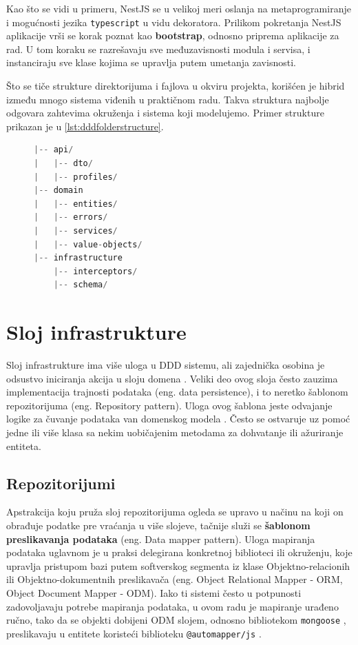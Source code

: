 \documentclass[12pt,oneside]{memoir}
\begin{document}
Kao što se vidi u primeru, NestJS se u velikoj meri oslanja na metaprogramiranje i mogućnosti jezika \verb|typescript| u vidu dekoratora. Prilikom pokretanja NestJS aplikacije vrši se korak poznat kao \textbf{bootstrap}, odnosno priprema aplikacije za rad. U tom koraku se razrešavaju sve međuzavisnosti modula i servisa, i instanciraju sve klase kojima se upravlja putem umetanja zavisnosti.

Što se tiče strukture direktorijuma i fajlova u okviru projekta, korišćen je hibrid između mnogo sistema viđenih u praktičnom radu. Takva struktura najbolje odgovara zahtevima okruženja i sistema koji modelujemo. Primer strukture prikazan je u \ref{lst:dddfolderstructure}.

\begin{figure}[h]
\begin{lstlisting}[language=JavaScript, style=ES6, caption={fajl tickets.module.ts},label={lst:dddfolderstructure}]
|-- api/
|   |-- dto/
|   |-- profiles/
|-- domain
|   |-- entities/
|   |-- errors/
|   |-- services/
|   |-- value-objects/
|-- infrastructure
    |-- interceptors/
    |-- schema/
\end{lstlisting}
\end{figure}

\section{Sloj infrastrukture}

Sloj infrastrukture ima više uloga u DDD sistemu, ali zajednička osobina je odsustvo iniciranja akcija u sloju domena \cite{dddfull}. Veliki deo ovog sloja često zauzima implementacija trajnosti podataka (eng. data persistence), i to neretko šablonom repozitorijuma (eng. Repository pattern). Uloga ovog šablona jeste odvajanje logike za čuvanje podataka van domenskog modela \cite{msrepository}. Često se ostvaruje uz pomoć jedne ili više klasa sa nekim uobičajenim metodama za dohvatanje ili ažuriranje entiteta.


\subsection{Repozitorijumi}
Apstrakcija koju pruža sloj repozitorijuma ogleda se upravo u načinu na koji on obrađuje podatke pre vraćanja u više slojeve, tačnije služi se \textbf{šablonom preslikavanja podataka} (eng. Data mapper pattern). Uloga mapiranja podataka uglavnom je u praksi delegirana konkretnoj biblioteci ili okruženju, koje upravlja pristupom bazi putem softverskog segmenta iz klase Objektno-relacionih ili Objektno-dokumentnih preslikavača (eng. Object Relational Mapper - ORM, Object Document Mapper - ODM). Iako ti sistemi često u potpunosti zadovoljavaju potrebe mapiranja podataka, u ovom radu je mapiranje urađeno ručno, tako da se objekti dobijeni ODM slojem, odnosno bibliotekom \verb|mongoose| \cite{mongoosedocs}, preslikavaju u entitete koristeći biblioteku \verb|@automapper/js| \cite{automapperjsdocs}.
\end{document}
